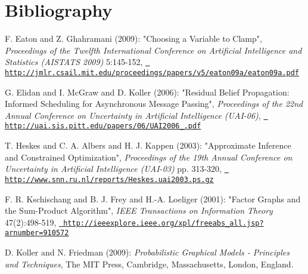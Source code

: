 \chapter{Bibliography}
\hypertarget{bibliography}{}\label{bibliography}
\label{bibliography_EaG09}%
%
 F. Eaton and Z. Ghahramani (2009)\+: "{}\+Choosing a Variable to Clamp"{}, {\itshape Proceedings of the Twelfth International Conference on Artificial Intelligence and Statistics (AISTATS 2009)} 5\+:145-\/152, \href{http://jmlr.csail.mit.edu/proceedings/papers/v5/eaton09a/eaton09a.pdf}{\texttt{ http\+://jmlr.\+csail.\+mit.\+edu/proceedings/papers/v5/eaton09a/eaton09a.\+pdf}}

\label{bibliography_EMK06}%
%
 G. Elidan and I. Mc\+Graw and D. Koller (2006)\+: "{}\+Residual Belief Propagation\+: Informed Scheduling for Asynchronous Message Passing"{}, {\itshape Proceedings of the 22nd Annual Conference on Uncertainty in Artificial Intelligence (UAI-\/06)}, \href{http://uai.sis.pitt.edu/papers/06/UAI2006_0091.pdf}{\texttt{ http\+://uai.\+sis.\+pitt.\+edu/papers/06/\+UAI2006\+\_.\+pdf}}

\label{bibliography_HAK03}%
%
 T. Heskes and C. A. Albers and H. J. Kappen (2003)\+: "{}\+Approximate Inference and Constrained Optimization"{}, {\itshape Proceedings of the 19th Annual Conference on Uncertainty in Artificial Intelligence (UAI-\/03)} pp. 313-\/320, \href{http://www.snn.ru.nl/reports/Heskes.uai2003.ps.gz}{\texttt{ http\+://www.\+snn.\+ru.\+nl/reports/\+Heskes.\+uai2003.\+ps.\+gz}}

\label{bibliography_KFL01}%
%
 F. R. Kschischang and B. J. Frey and H.-\/A. Loeliger (2001)\+: "{}\+Factor Graphs and the Sum-\/\+Product Algorithm"{}, {\itshape IEEE Transactions on Information Theory} 47(2)\+:498-\/519, \href{http://ieeexplore.ieee.org/xpl/freeabs_all.jsp?arnumber=910572}{\texttt{ http\+://ieeexplore.\+ieee.\+org/xpl/freeabs\+\_\+all.\+jsp?arnumber=910572}}

\label{bibliography_KoF09}%
%
 D. Koller and N. Friedman (2009)\+: {\itshape Probabilistic Graphical Models -\/ Principles and Techniques}, The MIT Press, Cambridge, Massachusetts, London, England.

